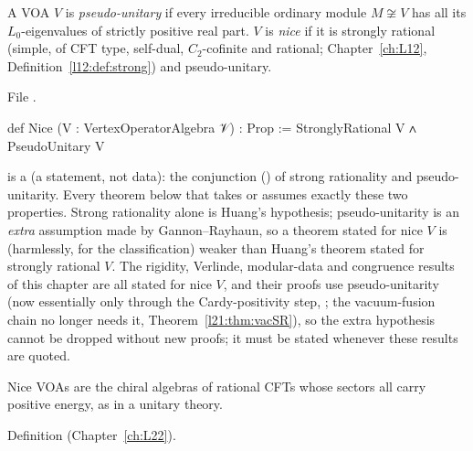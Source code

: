 \begin{definition}\label{l21:def:nice}
A VOA $V$ is \emph{pseudo-unitary} if every irreducible ordinary module $M\not\cong V$ has all its $L_0$-eigenvalues of
strictly positive real part. $V$ is \emph{nice} if it is strongly rational (simple, of CFT type, self-dual,
$C_2$-cofinite and rational; Chapter~\ref{ch:L12}, Definition~\ref{l12:def:strong}) and pseudo-unitary.
\end{definition}
\noindent File .
\begin{leancode}
def Nice (V : VertexOperatorAlgebra 𝒱) : Prop :=
  StronglyRational V ∧ PseudoUnitary V
\end{leancode}

\begin{dictionary}
 is a  (a statement, not data): the conjunction () of strong rationality and
pseudo-unitarity. Every theorem below that takes  or  assumes exactly these two
properties. Strong rationality alone is Huang's hypothesis; pseudo-unitarity is an \emph{extra} assumption made by
Gannon--Rayhaun, so a theorem stated for nice $V$ is (harmlessly, for the classification) weaker than Huang's theorem
stated for strongly rational $V$. The rigidity, Verlinde, modular-data and congruence results of this chapter are all
stated for nice $V$, and their proofs use pseudo-unitarity (now essentially only through the Cardy-positivity step,
; the vacuum-fusion chain no longer needs it, Theorem~\ref{l21:thm:vacSR}), so the
extra hypothesis cannot be dropped without new proofs; it must be stated whenever these results are quoted.
\end{dictionary}

\begin{physics}
Nice VOAs are the chiral algebras of rational CFTs whose sectors all carry positive energy, as in a unitary theory.
\end{physics}

\begin{status}
Definition (Chapter~\ref{ch:L22}).
\end{status}

